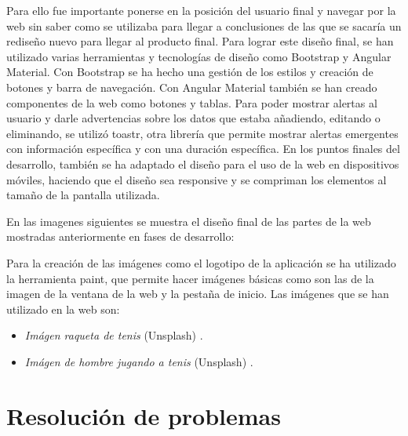 Para ello fue importante ponerse en la posición del usuario final y navegar por la web sin saber como se utilizaba para llegar a conclusiones de las que se sacaría un rediseño nuevo para llegar al producto final. Para lograr este diseño final, se han utilizado varias herramientas y tecnologías de diseño como Bootstrap y Angular Material. Con Bootstrap se ha hecho una gestión de los estilos y creación de botones y barra de navegación. Con Angular Material también se han creado componentes de la web como botones y tablas. Para poder mostrar alertas al usuario y darle advertencias sobre los datos que estaba añadiendo, editando o eliminando, se utilizó toastr, otra librería que permite mostrar alertas emergentes con información específica y con una duración específica.
En los puntos finales del desarrollo, también se ha adaptado el diseño para el uso de la web en dispositivos móviles, haciendo que el diseño sea responsive y se compriman los elementos al tamaño de la pantalla utilizada.

En las imagenes siguientes se muestra el diseño final de las partes de la web mostradas anteriormente en fases de desarrollo:







Para la creación de las imágenes como el logotipo de la aplicación se ha utilizado la herramienta paint, que permite hacer imágenes básicas como son las de la imagen de la ventana de la web y la pestaña de inicio.
Las imágenes que se han utilizado en la web son:
\begin{itemize}
\tightlist
\item
  \emph{Imágen raqueta de tenis} (Unsplash)
  \cite{img:raqueta-img}.
\item
  \emph{Imágen de hombre jugando a tenis} (Unsplash)
  \cite{img:hombre-tenis}.
\end{itemize}

\section{Resolución de problemas}\label{resolucion-problemas}

